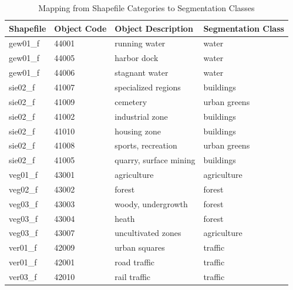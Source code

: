 \begin{table}[]
\centering
\small
\caption{Mapping from Shapefile Categories to Segmentation Classes}
\label{tab:category_mapping}
\begin{tabular}{|l|l|l|l|}
\hline
\textbf{Shapefile} & \textbf{Object Code} & \textbf{Object Description}    & \textbf{Segmentation Class} \\ \hline
gew01\_f           & 44001                & running water                  & water                          \\ \hline
gew01\_f           & 44005                & harbor dock                    & water                          \\ \hline
gew01\_f           & 44006                & stagnant water                 & water                          \\ \hline
sie02\_f           & 41007                & specialized regions            & buildings                      \\ \hline
sie02\_f           & 41009                & cemetery                       & urban greens                   \\ \hline
sie02\_f           & 41002                & industrial zone                & buildings                      \\ \hline
sie02\_f           & 41010                & housing zone                   & buildings                      \\ \hline
sie02\_f           & 41008                & sports, recreation          & urban greens                   \\ \hline
sie02\_f           & 41005                & quarry, surface mining         & buildings                      \\ \hline
veg01\_f           & 43001                & agriculture                    & agriculture                    \\ \hline
veg02\_f           & 43002                & forest                         & forest                         \\ \hline
veg03\_f           & 43003                & woody, undergrowth             & forest                         \\ \hline
veg03\_f           & 43004                & heath                          & forest                         \\ \hline
veg03\_f           & 43007                & uncultivated zones             & agriculture                    \\ \hline
ver01\_f           & 42009                & urban squares                  & traffic                        \\ \hline
ver01\_f           & 42001                & road traffic                   & traffic                        \\ \hline
ver03\_f           & 42010                & rail traffic                   & traffic                        \\ \hline
\end{tabular}
\end{table}

